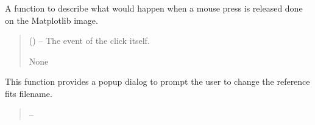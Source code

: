 \documentclass[letterpaper,11pt,english]{sphinxmanual}
\begin{document}
\begin{savenotes}
\begin{fulllineitems}
\begin{savenotes}\begin{fulllineitems}
\label{\detokenize{code/opihiexarata.gui.selector:opihiexarata.gui.selector.TargetSelectorWindow.__connect_matplotlib_mouse_release_event}}
\pysigstartsignatures
{}
\pysigstopsignatures
\sphinxAtStartPar
A function to describe what would happen when a mouse press is
released done on the Matplotlib image.
\begin{quote}\begin{description}
\sphinxAtStartPar
{} () – The event of the click itself.

\sphinxAtStartPar
None

\end{description}\end{quote}

\end{fulllineitems}\end{savenotes}


\begin{savenotes}\begin{fulllineitems}
\label{\detokenize{code/opihiexarata.gui.selector:opihiexarata.gui.selector.TargetSelectorWindow.__connect_push_button_change_reference_filename}}
\pysigstartsignatures
{}
\pysigstopsignatures
\sphinxAtStartPar
This function provides a popup dialog to prompt the user to change
the reference fits filename.
\begin{quote}\begin{description}
\sphinxAtStartPar
{} – 


\end{description}
\end{quote}
\end{fulllineitems}
\end{savenotes}
\end{fulllineitems}
\end{savenotes}
\end{document}
